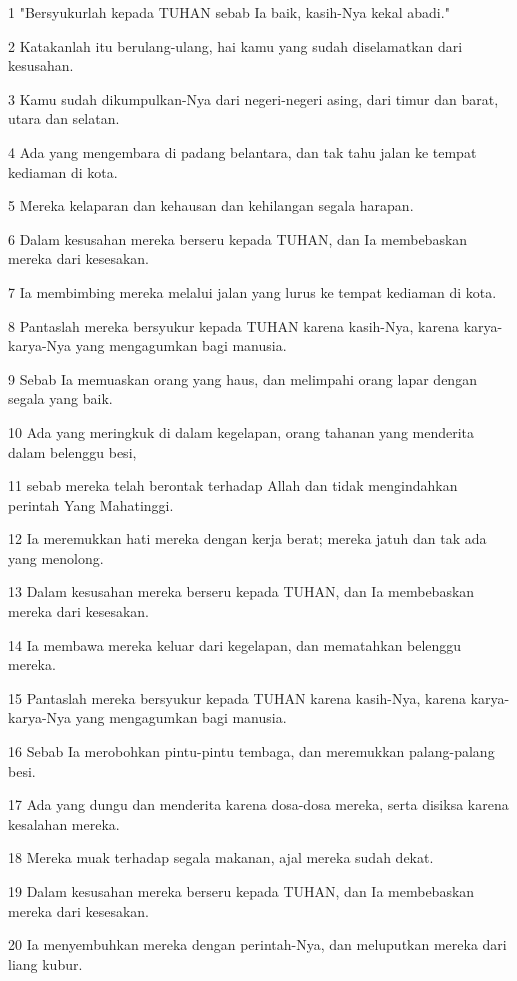 \par 1 "Bersyukurlah kepada TUHAN sebab Ia baik, kasih-Nya kekal abadi."
\par 2 Katakanlah itu berulang-ulang, hai kamu yang sudah diselamatkan dari kesusahan.
\par 3 Kamu sudah dikumpulkan-Nya dari negeri-negeri asing, dari timur dan barat, utara dan selatan.
\par 4 Ada yang mengembara di padang belantara, dan tak tahu jalan ke tempat kediaman di kota.
\par 5 Mereka kelaparan dan kehausan dan kehilangan segala harapan.
\par 6 Dalam kesusahan mereka berseru kepada TUHAN, dan Ia membebaskan mereka dari kesesakan.
\par 7 Ia membimbing mereka melalui jalan yang lurus ke tempat kediaman di kota.
\par 8 Pantaslah mereka bersyukur kepada TUHAN karena kasih-Nya, karena karya-karya-Nya yang mengagumkan bagi manusia.
\par 9 Sebab Ia memuaskan orang yang haus, dan melimpahi orang lapar dengan segala yang baik.
\par 10 Ada yang meringkuk di dalam kegelapan, orang tahanan yang menderita dalam belenggu besi,
\par 11 sebab mereka telah berontak terhadap Allah dan tidak mengindahkan perintah Yang Mahatinggi.
\par 12 Ia meremukkan hati mereka dengan kerja berat; mereka jatuh dan tak ada yang menolong.
\par 13 Dalam kesusahan mereka berseru kepada TUHAN, dan Ia membebaskan mereka dari kesesakan.
\par 14 Ia membawa mereka keluar dari kegelapan, dan mematahkan belenggu mereka.
\par 15 Pantaslah mereka bersyukur kepada TUHAN karena kasih-Nya, karena karya-karya-Nya yang mengagumkan bagi manusia.
\par 16 Sebab Ia merobohkan pintu-pintu tembaga, dan meremukkan palang-palang besi.
\par 17 Ada yang dungu dan menderita karena dosa-dosa mereka, serta disiksa karena kesalahan mereka.
\par 18 Mereka muak terhadap segala makanan, ajal mereka sudah dekat.
\par 19 Dalam kesusahan mereka berseru kepada TUHAN, dan Ia membebaskan mereka dari kesesakan.
\par 20 Ia menyembuhkan mereka dengan perintah-Nya, dan meluputkan mereka dari liang kubur.
